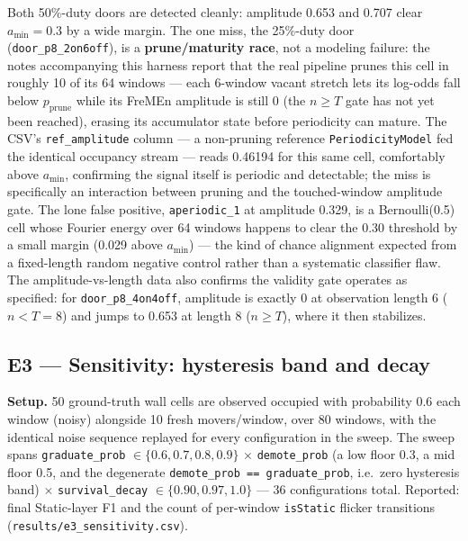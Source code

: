 \documentclass[conference]{IEEEtran}
\begin{document}
Both 50\%-duty doors are detected cleanly: amplitude 0.653 and 0.707 clear
$a_{\min}=0.3$ by a wide margin. The one miss, the 25\%-duty door
(\texttt{door\_p8\_2on6off}), is a \textbf{prune/maturity race}, not a modeling failure:
the notes accompanying this harness report that the real pipeline prunes
this cell in roughly 10 of its 64 windows --- each 6-window vacant stretch
lets its log-odds fall below $p_{\text{prune}}$ while its FreMEn amplitude
is still 0 (the $n\ge T$ gate has not yet been reached), erasing its
accumulator state before periodicity can mature. The CSV's \texttt{ref\_amplitude}
column --- a non-pruning reference \texttt{PeriodicityModel} fed the identical
occupancy stream --- reads 0.46194 for this same cell, comfortably above
$a_{\min}$, confirming the signal itself is periodic and detectable; the
miss is specifically an interaction between pruning and the touched-window
amplitude gate. The lone false positive, \texttt{aperiodic\_1} at amplitude 0.329,
is a Bernoulli(0.5) cell whose Fourier energy over 64 windows happens to
clear the 0.30 threshold by a small margin (0.029 above $a_{\min}$) --- the
kind of chance alignment expected from a fixed-length random negative
control rather than a systematic classifier flaw. The amplitude-vs-length
data also confirms the validity gate operates as specified: for
\texttt{door\_p8\_4on4off}, amplitude is exactly 0 at observation length 6 ($n<T{=}8$)
and jumps to 0.653 at length 8 ($n\ge T$), where it then stabilizes.

\subsection{E3 --- Sensitivity: hysteresis band and decay}

\textbf{Setup.} 50 ground-truth wall cells are observed occupied with probability
0.6 each window (noisy) alongside 10 fresh movers/window, over 80 windows,
with the identical noise sequence replayed for every configuration in the
sweep. The sweep spans \texttt{graduate\_prob} $\in\{0.6,0.7,0.8,0.9\}$
$\times$ \texttt{demote\_prob} (a low floor 0.3, a mid floor 0.5, and the degenerate
\texttt{demote\_prob == graduate\_prob}, i.e.\ zero hysteresis band)
$\times$ \texttt{survival\_decay} $\in\{0.90,0.97,1.0\}$ --- 36 configurations total.
Reported: final Static-layer F1 and the count of per-window \texttt{isStatic}
flicker transitions (\texttt{results/e3\_sensitivity.csv}).
\end{document}

